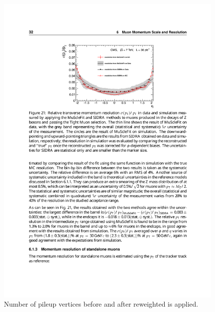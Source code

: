 \begin{figure}[tbh]
\centering
\includegraphics[width=5in]{figures/muonres.pdf}
\caption{Number of pileup vertices before and after reweighted is applied.}
\label{fig:pu}
\end{figure}




